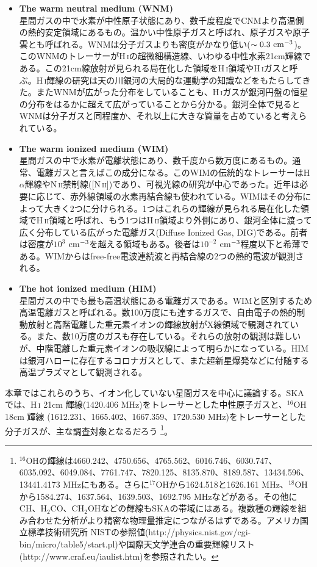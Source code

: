\begin{itemize}
\item {\bf The warm neutral medium (WNM)}\\
星間ガスの中で水素が中性原子状態にあり、数千度程度でCNMより高温側の熱的安定領域にあるもの。温かい中性原子ガスと呼ばれ、原子ガスや原子雲とも呼ばれる。WNMは分子ガスよりも密度がかなり低い($\sim 0.3~{\rm cm^{-3}}$)。このWNMのトレーサーがH\,\textsc{i}の超微細構造線、いわゆる中性水素21cm輝線である。この21cm線放射が見られる局在化した領域をH\,\textsc{i}領域やH\,\textsc{i}ガスと呼ぶ。H\,\textsc{i}輝線の研究は天の川銀河の大局的な運動学の知識などをもたらしてきた。またWNMが広がった分布をしていることも、H\,\textsc{i}ガスが銀河円盤の恒星の分布をはるかに超えて広がっていることから分かる。銀河全体で見るとWNMは分子ガスと同程度か、それ以上に大きな質量を占めていると考えられている。

\item {\bf The warm ionized medium (WIM)}\\
星間ガスの中で水素が電離状態にあり、数千度から数万度にあるもの。通常、電離ガスと言えばこの成分になる。このWIMの伝統的なトレーサーはH\,\textsc{$\alpha$}輝線やN\,\textsc{ii}禁制線([N\,\textsc{ii}])であり、可視光線の研究が中心であった。近年は必要に応じて、赤外線領域の水素再結合線も使われている。WIMはその分布によって大きく2つに分けられる。1つはこれらの輝線が見られる局在化した領域でH\,\textsc{ii}領域と呼ばれ、もう1つはH\,\textsc{ii}領域より外側にあり、銀河全体に渡って広く分布している広がった電離ガス(Diffuse Ionized Gas, DIG)である。前者は密度が$10^3$ ${\rm cm^{-3}}$を越える領域もある。後者は$10^{-2}$ ${\rm cm^{-3}}$程度以下と希薄である。WIMからはfree-free電波連続波と再結合線の2つの熱的電波が観測される。

\item {\bf The hot ionized medium (HIM)}\\
星間ガスの中でも最も高温状態にある電離ガスである。WIMと区別するため高温電離ガスと呼ばれる。数100万度にも達するガスで、自由電子の熱的制動放射と高階電離した重元素イオンの輝線放射がX線領域で観測されている。また、数10万度のガスも存在している。それらの放射の観測は難しいが、中階電離した重元素イオンの吸収線によって明らかになっている。HIMは銀河ハローに存在するコロナガスとして、また超新星爆発などに付随する高温プラズマとして観測される。

\end{itemize}
本章ではこれらのうち、イオン化していない星間ガスを中心に議論する。SKAでは、H\,\textsc{i} 21cm 輝線(1420.406 MHz)をトレーサーとした中性原子ガスと、$^{16}$OH 18cm 輝線 (1612.231、1665.402、1667.359、1720.530 MHz)をトレーサーとした分子ガスが、主な調査対象となるだろう
\footnote{
$^{16}$OHの輝線は4660.242、4750.656、4765.562、6016.746、6030.747、6035.092、6049.084、7761.747、7820.125、8135.870、8189.587、13434.596、13441.4173 MHzにもある。さらに$^{17}$OHから1624.518と1626.161 MHz、$^{18}$OHから1584.274、1637.564、1639.503、1692.795 MHzなどがある。その他にCH、H$_2$CO、CH$_2$OHなどの輝線もSKAの帯域にはある。複数種の輝線を組み合わせた分析がより精密な物理量推定につながるはずである。アメリカ国立標準技術研究所 NISTの参照値(http://physics.nist.gov/cgi-bin/micro/table5/start.pl)や国際天文学連合の重要輝線リスト(http://www.craf.eu/iaulist.htm)を参照されたい。
}。

